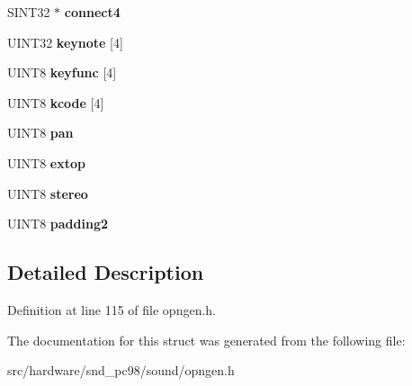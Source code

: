 \begin{DoxyCompactItemize}
\item 
\hypertarget{structOPNCH_a6799b34728d3d03db8d060648478c7d8}{S\-I\-N\-T32 $\ast$ {\bfseries connect4}}\label{structOPNCH_a6799b34728d3d03db8d060648478c7d8}

\item 
\hypertarget{structOPNCH_a3a8c0a83a5b8a840ad587ffacc822ee4}{U\-I\-N\-T32 {\bfseries keynote} \mbox{[}4\mbox{]}}\label{structOPNCH_a3a8c0a83a5b8a840ad587ffacc822ee4}

\item 
\hypertarget{structOPNCH_a06193c0869aa5105301ae33763bae070}{U\-I\-N\-T8 {\bfseries keyfunc} \mbox{[}4\mbox{]}}\label{structOPNCH_a06193c0869aa5105301ae33763bae070}

\item 
\hypertarget{structOPNCH_a0b3b1220494b8f9e1b5fb136efb238e1}{U\-I\-N\-T8 {\bfseries kcode} \mbox{[}4\mbox{]}}\label{structOPNCH_a0b3b1220494b8f9e1b5fb136efb238e1}

\item 
\hypertarget{structOPNCH_a00eacd912f533905d00e033160d88b16}{U\-I\-N\-T8 {\bfseries pan}}\label{structOPNCH_a00eacd912f533905d00e033160d88b16}

\item 
\hypertarget{structOPNCH_a6e40b8422c6867f4dc5d85816e317f5b}{U\-I\-N\-T8 {\bfseries extop}}\label{structOPNCH_a6e40b8422c6867f4dc5d85816e317f5b}

\item 
\hypertarget{structOPNCH_a8581a9cc9479b6e7dbc9e4163522252e}{U\-I\-N\-T8 {\bfseries stereo}}\label{structOPNCH_a8581a9cc9479b6e7dbc9e4163522252e}

\item 
\hypertarget{structOPNCH_aa9c335f958d4ed5d2172eddc7d2d0a6f}{U\-I\-N\-T8 {\bfseries padding2}}\label{structOPNCH_aa9c335f958d4ed5d2172eddc7d2d0a6f}

\end{DoxyCompactItemize}


\subsection{Detailed Description}


Definition at line 115 of file opngen.\-h.



The documentation for this struct was generated from the following file\-:\begin{DoxyCompactItemize}
\item 
src/hardware/snd\-\_\-pc98/sound/opngen.\-h\end{DoxyCompactItemize}
